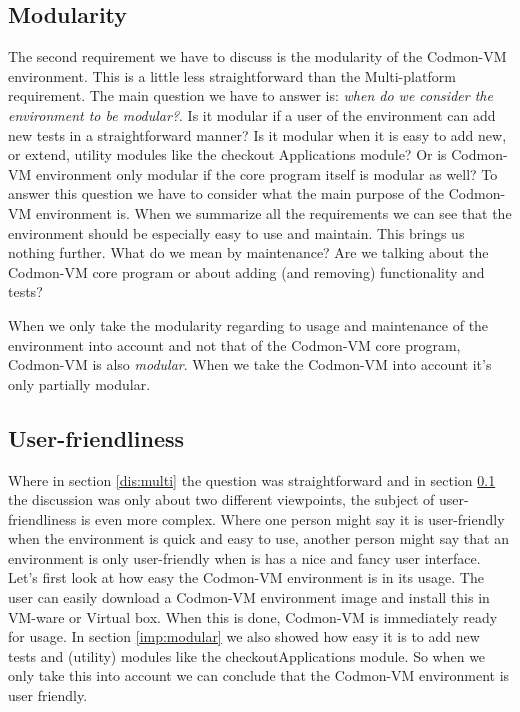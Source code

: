 \documentclass{article}
\newcommand{\project}{Codmon-VM}
\begin{document}
\subsection{Modularity}
\label{dis:modular}
The second requirement we have to discuss is the modularity of the \project{} environment. This is a little less straightforward than the Multi-platform requirement. The main question we have to answer is: 
\emph{when do we consider the environment to be modular?}. Is it modular if a user of the environment can add new tests in a straightforward manner? Is it modular when it is easy to add new, or extend, utility 
modules like the checkout Applications module? Or is \project{} environment only modular if the core program itself is modular as well? To answer this question we have to consider what the main purpose of the 
\project{} environment is. When we summarize all the requirements we can see that the environment should be especially easy to use and maintain. This brings us nothing further. What do we mean by 
maintenance? Are we talking about the \project{} core program or about adding (and removing) functionality and tests?

\noindent When we only take the modularity regarding to usage and maintenance of the environment into account and not that of the \project{} core program, \project{} is also \emph{modular}. 
When we take the \project{} into account it's only partially modular.\\

\subsection{User-friendliness}
\label{dis:user}
Where in section \ref{dis:multi} the question was straightforward and in section \ref{dis:modular} the discussion was only about two different viewpoints, the subject of user-friendliness is even more complex. 
Where one person might say it is user-friendly when the environment is quick and easy to use, another person might say that an environment is only user-friendly when is has a nice and fancy user interface.\\

\noindent Let's first look at how easy the \project{} environment is in its usage. The user can easily download a \project{} environment image and install this in VM-ware or Virtual box. When this is done, 
\project{} is immediately ready for usage. In section \ref{imp:modular} we also showed how easy it is to add new tests and (utility) modules like the checkoutApplications module. So when we only take this into 
account we can conclude that the \project{} environment is user friendly.\\
\end{document}

